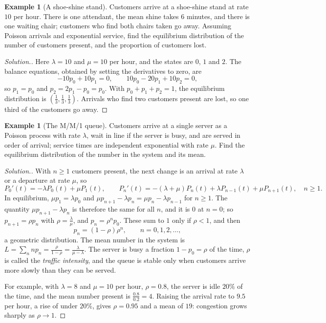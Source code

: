 \documentclass[12pt,a4paper]{report}
\theoremstyle{definition}
\newtheorem{exa}[thm]{Example}
\newenvironment{solution}
  {\renewcommand{\qedsymbol}{}\begin{proof}[\textit{Solution}.]}
  {\end{proof}}
\begin{document}
\begin{exa}[A shoe-shine stand]
\label{ex:shoeshine}
Customers arrive at a shoe-shine stand at rate $10$ per hour. There is one attendant, the mean
shine takes $6$ minutes, and there is one waiting chair; customers who find both chairs taken go
away. Assuming Poisson arrivals and exponential service, find the equilibrium distribution of
the number of customers present, and the proportion of customers lost.
\end{exa}

\begin{solution}
Here $\lambda = 10$ and $\mu = 10$ per hour, and the states are $0$, $1$ and $2$. The balance equations,
obtained by setting the derivatives to zero, are
\[-10p_0 + 10p_1 = 0,\qquad 10p_0 - 20p_1 + 10p_2 = 0,\]
so $p_1 = p_0$ and $p_2 = 2p_1 - p_0 = p_0$. With $p_0 + p_1 + p_2 = 1$, the equilibrium distribution is
$\left(\frac13, \frac13, \frac13\right)$. Arrivals who find two customers present are lost, so one third of
the customers go away.
\end{solution}

\begin{exa}[The M/M/1 queue]
\label{ex:mm1}
Customers arrive at a single server as a Poisson process with rate $\lambda$, wait in line if the
server is busy, and are served in order of arrival; service times are independent exponential
with rate $\mu$. Find the equilibrium distribution of the number in the system and its mean.
\end{exa}

\begin{solution}
With $n\geq 1$ customers present, the next change is an arrival at rate $\lambda$ or a departure at rate
$\mu$, so
\[P_0'(t) = -\lambda P_0(t) + \mu P_1(t),\qquad P_n'(t) = -(\lambda + \mu)P_n(t) + \lambda P_{n-1}(t) + \mu P_{n+1}(t),\quad n\geq 1 .\]
In equilibrium, $\mu p_1 = \lambda p_0$ and $\mu p_{n+1} - \lambda p_n = \mu p_n - \lambda p_{n-1}$ for $n\geq 1$. The
quantity $\mu p_{n+1} - \lambda p_n$ is therefore the same for all $n$, and it is $0$ at $n = 0$; so
$p_{n+1} = \rho p_n$ with $\rho = \frac\lambda\mu$, and $p_n = \rho^np_0$. These sum to $1$ only if $\rho<1$, and then
\[p_n = (1 - \rho)\rho^n,\qquad n = 0, 1, 2, \dots,\]
a geometric distribution. The mean number in the system is
$L = \sum_nnp_n = \frac{\rho}{1 - \rho} = \frac{\lambda}{\mu - \lambda}$. The server is busy a fraction $1 - p_0 = \rho$ of
the time, $\rho$ is called the \emph{traffic intensity}, and the queue is stable only when customers
arrive more slowly than they can be served.

For example, with $\lambda = 8$ and $\mu = 10$ per hour, $\rho = 0.8$, the server is idle $20\%$ of the time,
and the mean number present is $\frac{0.8}{0.2} = 4$. Raising the arrival rate to $9.5$ per hour, a
rise of under $20\%$, gives $\rho = 0.95$ and a mean of $19$: congestion grows sharply as $\rho\to 1$.
\end{solution}
\end{document}

